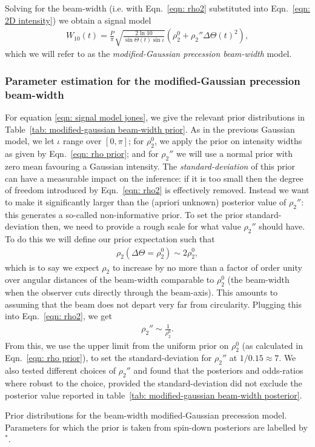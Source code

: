 \documentclass[../full_thesis/full_thesis.tex]{subfiles}
\newcommand{\thisdir}{../comparing_periodic_modulations}
\begin{document}
Solving for the beam-width (i.e. with Eqn.~\eqref{eqn: rho2} substituted into
Eqn.~\eqref{eqn: 2D intensity}) we obtain a signal model
\begin{align}
W_{10}(t) = \frac{P}{\pi}\sqrt{\frac{2\ln10}{\sin\Theta(t)\sin\iota}}
 \left(\rho_2^{0} + \rho_2'' \Delta\Theta(t)^{2} \right),
\label{eqn: signal model jones}
\end{align}
which we will refer to as the \emph{modified-Gaussian precession beam-width} model.

\subsubsection{Parameter estimation for the modified-Gaussian precession
               beam-width}

For equation \eqref{eqn: signal model jones}, we give the relevant prior distributions
in Table~\ref{tab: modified-gaussian beam-width prior}. As in the previous
Gaussian model, we let $\iota$ range over $[0, \pi]$; for $\rho_2^{0}$, we
apply the prior on intensity widths as given by Eqn.~\eqref{eqn: rho
prior}; and for $\rho_2''$ we will use a normal prior with zero mean
favouring a Gaussian intensity. The \emph{standard-deviation} of this prior can
have a measurable impact on the inference: if it is too small then the degree
of freedom introduced by Eqn.~\ref{eqn: rho2} is effectively removed. Instead
we want to make it significantly larger than the (apriori unknown) posterior
value of $\rho_2''$: this generates a so-called non-informative prior. To set
the prior standard-deviation then, we need to provide a rough scale for what
value $\rho_{2}''$ should have. To do this we will define our prior expectation
such that
\begin{align}
\rho_2(\Delta\Theta = \rho_2^0) \sim 2\rho_2^0,
\label{eqn: rho2 prior}
\end{align}
which is to say we expect $\rho_2$ to increase by no more than a factor of
order unity over angular distances of the beam-width comparable to $\rho_2^0$
(the beam-width when the observer cuts directly through the beam-axis). This
amounts to assuming that the beam does not depart very far from circularity.
Plugging this into Eqn.~\eqref{eqn: rho2}, we get
\begin{align}
\rho_2'' \sim \frac{1}{\rho_2^0}.
\label{eqn: rho2dd prior}
\end{align}
From this, we use the upper limit from the uniform prior on $\rho_2^0$ (as calculated in
Eqn.~\eqref{eqn: rho prior}), to set the
standard-deviation for $\rho_2''$ at $1/0.15\approx7$.
We also tested different choices of $\rho_2''$ and found that the
posteriors and odds-ratios where robust to the choice, provided the
standard-deviation did not exclude the posterior value reported in
table~\ref{tab: modified-gaussian beam-width posterior}.
\begin{table}
\centering
\caption{Prior distributions for the beam-width modified-Gaussian precession
model. Parameters for which the prior is taken from spin-down posteriors are
labelled by $^{*}$.}
\label{tab: modified-gaussian beam-width prior}

\end{table}
\end{document}
